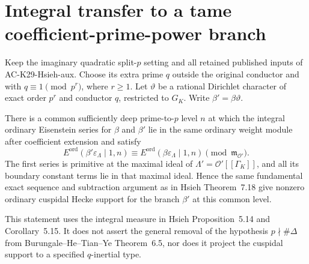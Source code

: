 \section{Integral transfer to a tame coefficient-prime-power branch}
\label{sec:cubic-hsieh-tame-measure}

\begin{proposition}
\label{AC-G67-measure}
Keep the imaginary quadratic split-$p$ setting and all retained
published inputs of AC-K29-Hsieh-aux.  Choose its extra prime $q$
outside the original conductor and with $q\equiv1\pmod{p^r}$,
where $r\ge1$.  Let $\vartheta$ be a rational Dirichlet character
of exact order $p^r$ and conductor $q$, restricted to $G_K$.
Write $\beta'=\beta\vartheta$.

There is a common sufficiently deep prime-to-$p$ level $n$ at
which the integral ordinary Eisenstein series for $\beta$ and
$\beta'$ lie in the same ordinary weight module after coefficient
extension and satisfy
\[
        E^{\mathrm{ord}}(\beta'\varepsilon_\Lambda\mid1,n)
        \equiv E^{\mathrm{ord}}(\beta\varepsilon_\Lambda\mid1,n)
                       \pmod{\mathfrak m_{\mathcal O'}}.       \tag{G67.1}
\]
The first series is primitive at the maximal ideal of
$\Lambda'=\mathcal O'[[\Gamma_K]]$, and all its boundary
constant terms lie in that maximal ideal.  Hence the same
fundamental exact sequence and subtraction argument as in
Hsieh Theorem~7.18 give nonzero ordinary cuspidal Hecke support
for the branch $\beta'$ at this common level.

This statement uses the integral measure in Hsieh
Proposition~5.14 and Corollary~5.15.  It does not assert the
general removal of the hypothesis $p\nmid\#\Delta$ from
Burungale--He--Tian--Ye Theorem~6.5, nor does it project the
cuspidal support to a specified $q$-inertial type.
\end{proposition}
